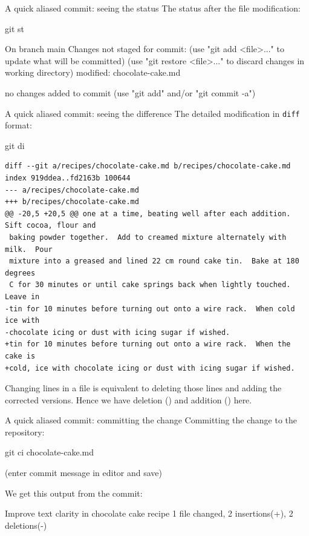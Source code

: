 \documentclass{git_course}
\begin{document}
\begin{frame}[fragile]{A quick aliased commit: seeing the status}
    The status after the file modification:
    \begin{shellcode}
        git st
    \end{shellcode}
    \begin{outputcode}[autogobble=false]
On branch main
Changes not staged for commit:
  (use "git add <file>..." to update what will be committed)
  (use "git restore <file>..." to discard changes in working directory)
        modified:   chocolate-cake.md

no changes added to commit (use "git add" and/or "git commit -a")
    \end{outputcode}
\end{frame}

\begin{frame}[fragile]{A quick aliased commit: seeing the difference}
    The detailed modification in \texttt{diff} format:
    \begin{shellcode}
        git di
    \end{shellcode}
    \begin{verbatim}
diff --git a/recipes/chocolate-cake.md b/recipes/chocolate-cake.md
index 919ddea..fd2163b 100644
--- a/recipes/chocolate-cake.md
+++ b/recipes/chocolate-cake.md
@@ -20,5 +20,5 @@ one at a time, beating well after each addition.  Sift cocoa, flour and
 baking powder together.  Add to creamed mixture alternately with milk.  Pour
 mixture into a greased and lined 22 cm round cake tin.  Bake at 180 degrees
 C for 30 minutes or until cake springs back when lightly touched.  Leave in
-tin for 10 minutes before turning out onto a wire rack.  When cold ice with
-chocolate icing or dust with icing sugar if wished.
+tin for 10 minutes before turning out onto a wire rack.  When the cake is
+cold, ice with chocolate icing or dust with icing sugar if wished.
    \end{verbatim}
    Changing lines in a file is equivalent to deleting those lines and
    adding the corrected versions.  Hence we have deletion (\code{-}) and
    addition (\code{+}) here.
\end{frame}

\begin{frame}[fragile]{A quick aliased commit: committing the change}
    Committing the change to the repository:
    \begin{shellcode}
        git ci chocolate-cake.md
    \end{shellcode}
    (enter commit message in editor and save)

    We get this output from the commit:
    \begin{outputcode}[autogobble=false]
[main c0aa49a] Improve text clarity in chocolate cake recipe
 1 file changed, 2 insertions(+), 2 deletions(-)
    \end{outputcode}
\end{frame}
\end{document}
